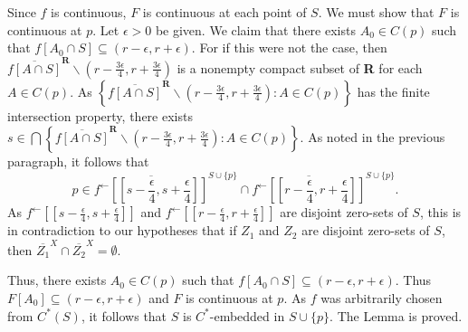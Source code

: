 \documentclass{article}
\begin{document}
Since $f$ is continuous, $F$ is continuous at each point of $S$. We must show that $F$ is continuous at $p$. Let $\epsilon>0$ be given. We claim that there exists $A_0\in C(p)$ such that $f\left[A_0\cap S\right] \subseteq (r-\epsilon, r+\epsilon).$ For if this were not the case, then $\overline{f\left[A\cap S\right]}^{\textbf{R}}\backslash (r-\frac{3\epsilon}{4}, r+\frac{3\epsilon}{4})$ is a nonempty compact subset of \textbf{R} for each $A\in C(p).$ As $\left\{\overline{f[A\cap S]}^{\textbf{R}}\backslash (r-\frac{3\epsilon}{4}, r+\frac{3\epsilon}{4}): A\in C(p)\right\}$ has the finite intersection property, there exists $s\in \bigcap \left\{\overline{f[A\cap S]}^{\textbf{R}}\backslash (r-\frac{3\epsilon}{4}, r+\frac{3\epsilon}{4}): A\in C(p)\right\}$. As noted in the previous paragraph, it follows that $$p\in \overline{f^\leftarrow\left[[s-\frac{\epsilon}{4},s+\frac{\epsilon}{4}]\right]}^{S\cup \{p\}} \cap \overline{f^\leftarrow \left[[r-\frac{\epsilon}{4}, r+\frac{\epsilon}{4}]\right]}^{S\cup \{p\}}.$$
As  $f^\leftarrow\left[[s-\frac{\epsilon}{4},s+\frac{\epsilon}{4}]\right]$ and $f^\leftarrow \left[[r-\frac{\epsilon}{4}, r+\frac{\epsilon}{4}]\right]$ are disjoint zero-sets of $S$, this is in contradiction to our hypotheses that if $Z_1$ and $Z_2$ are disjoint zero-sets of $S$, then $\overline{Z_1}^X\cap \overline{Z_2}^X=\emptyset$. 


 
Thus, there exists $A_0\in C(p)$ such that $f\left[A_0\cap S\right]\subseteq (r-\epsilon, r+\epsilon).$ Thus $F[A_0]\subseteq (r-\epsilon, r+\epsilon)$ and $F$ is continuous at $p$. As $f$ was arbitrarily chosen from $C^*(S)$, it follows that $S$ is $C^*$-embedded in $S\cup\{p\}.$ The Lemma is proved.
\end{document}
